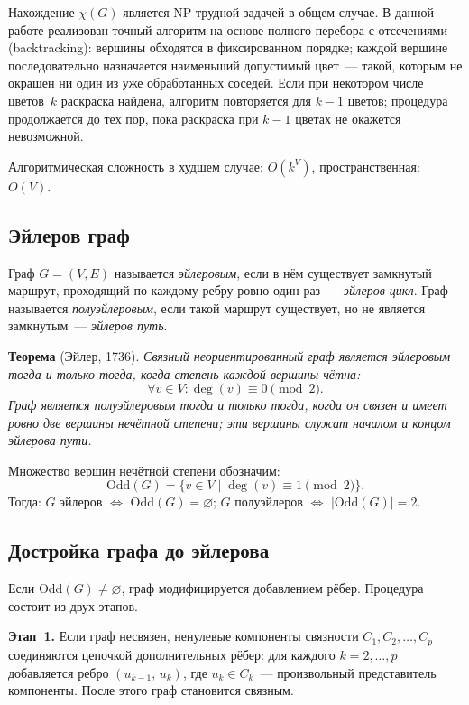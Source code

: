 Нахождение $\chi(G)$ является NP-трудной задачей в общем случае.
В данной работе реализован точный алгоритм на основе полного перебора
с отсечениями (backtracking): вершины обходятся в фиксированном порядке;
каждой вершине последовательно назначается наименьший допустимый цвет~---
такой, которым не окрашен ни один из уже обработанных соседей.
Если при некотором числе цветов~$k$ раскраска найдена, алгоритм
повторяется для $k - 1$ цветов; процедура продолжается до тех пор,
пока раскраска при $k - 1$ цветах не окажется невозможной.

Алгоритмическая сложность в худшем случае: $O(k^V)$,
пространственная: $O(V)$.


\subsection{Эйлеров граф}

Граф $G = (V, E)$ называется \textit{эйлеровым}, если в нём существует
замкнутый маршрут, проходящий по каждому ребру ровно один раз~---
\textit{эйлеров цикл}. Граф называется \textit{полуэйлеровым}, если
такой маршрут существует, но не является замкнутым~--- \textit{эйлеров путь}.

\textbf{Теорема} (Эйлер, 1736). \textit{Связный неориентированный граф
является эйлеровым тогда и только тогда, когда степень каждой вершины чётна:}
\[
    \forall v \in V : \deg(v) \equiv 0 \pmod{2}.
\]
\textit{Граф является полуэйлеровым тогда и только тогда, когда он
связен и имеет ровно две вершины нечётной степени; эти вершины служат
началом и концом эйлерова пути.}

Множество вершин нечётной степени обозначим:
\[
    \mathrm{Odd}(G) = \{v \in V \mid \deg(v) \equiv 1 \pmod{2}\}.
\]
Тогда: $G$ эйлеров $\Leftrightarrow$ $\mathrm{Odd}(G) = \varnothing$;
$G$ полуэйлеров $\Leftrightarrow$ $|\mathrm{Odd}(G)| = 2$.

\subsection{Достройка графа до эйлерова}

Если $\mathrm{Odd}(G) \neq \varnothing$, граф модифицируется
добавлением рёбер. Процедура состоит из двух этапов.

\textbf{Этап~1.} Если граф несвязен, ненулевые компоненты связности
$C_1, C_2, \ldots, C_p$ соединяются цепочкой дополнительных рёбер:
для каждого $k = 2, \ldots, p$ добавляется ребро
$(u_{k-1},\, u_k)$, где $u_k \in C_k$~--- произвольный
представитель компоненты. После этого граф становится связным.

